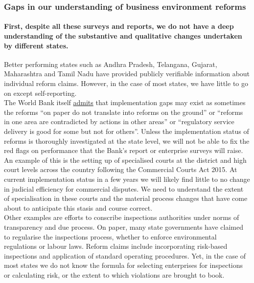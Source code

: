 \documentclass[a4paper, 12pt, twoside]{article}
\begin{document}
\subsubsection*{Gaps in our understanding of business environment reforms}  

\vspace{1.5em}

\paragraph{First, despite all these surveys and reports, we do not have a deep understanding of the substantive and qualitative changes undertaken by different states.}
  
Better performing states such as Andhra Pradesh, Telangana, Gujarat, Maharashtra and Tamil Nadu have provided publicly verifiable information about individual reform claims. However, in the case of most states, we have little to go on except self-reporting. \\

The World Bank itself \href{https://drive.google.com/open?id=1jWibamS6WakPfv3AM9Zm0jUpVX15Y8H3}{admits} that implementation gaps may exist as sometimes the reforms “on paper do not translate into reforms on the ground” or “reforms in one area are contradicted by actions in other areas” or “regulatory service delivery is good for some but not for others”. Unless the implementation status of reforms is thoroughly investigated at the state level, we will not be able to fix the red flags on performance that the Bank’s report or enterprise surveys will raise.\\

An example of this is the setting up of specialised courts at the district and high court levels across the country following the Commercial Courts Act 2015. At current implementation status in a few years we will likely find little to no change in judicial efficiency for commercial disputes. We need to understand the extent of specialisation in these courts and the material process changes that have come about to anticipate this stasis and course correct. \\

Other examples are efforts to conscribe inspections authorities under norms of transparency and due process. On paper, many state governments have claimed to regularise the inspections process, whether to enforce environmental regulations or labour laws. Reform claims include incorporating risk-based inspections and application of standard operating procedures. Yet, in the case of most states we do not know the formula for selecting enterprises for inspections or calculating risk, or the extent to which violations are brought to book. \\
\end{document}
